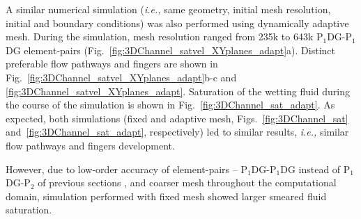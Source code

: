 \documentclass[preprint,authoryear,12pt]{elsarticle}
\newcommand{\PN}[2][error]{P$_{#1}$DG-P$_{#2}$}
\newcommand{\PNDG}[2][error]{P$_{#1}$DG-P$_{#2}$DG}
\newcommand{\ie}{{\it i.e., }}
\begin{document}
\medskip
A similar numerical simulation (\ie same geometry, initial mesh resolution, initial and boundary conditions) was also performed using dynamically adaptive mesh. During the simulation, mesh resolution ranged from 235k to 643k \PNDG[1]{1} element-pairs (Fig.~\ref{fig:3DChannel_satvel_XYplanes_adapt}a). Distinct preferable flow pathways and fingers are shown in Fig.~\ref{fig:3DChannel_satvel_XYplanes_adapt}b-c and \ref{fig:3DChannel_satvel_XYplanes_adapt}. Saturation of the wetting fluid during the course of the simulation is shown in Fig.~\ref{fig:3DChannel_sat_adapt}. As expected, both simulations (fixed and adaptive mesh, Figs.~\ref{fig:3DChannel_sat} and~\ref{fig:3DChannel_sat_adapt}, respectively) led to similar results, \ie similar flow pathways and fingers development. 

\medskip
However, due to low-order accuracy of element-pairs -- \PNDG[1]{1} instead of \PN[1]{2} of previous sections \citep[for full investigation on numerical accuracy associated with these element-pairs, see][]{salinas2015,salinas_2016,salinas_2018,adam_2016, gomes_2017}, and coarser mesh throughout the computational domain, simulation performed with fixed mesh showed larger smeared fluid saturation. 



\end{document}
